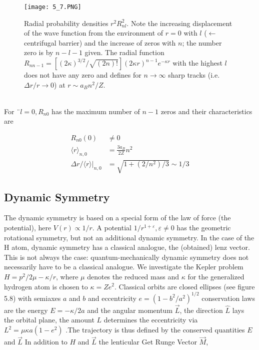 \begin{figure}[ht]
    \begin{minipage}{0.5\textwidth}
        \centering
        \texttt{[image: 5\_7.PNG]}
    \end{minipage}
    \begin{minipage}{0.5\textwidth}
        \caption{Radial probability densities $r^2R^2_{nl}$. Note the increasing displacement of the wave function        from the environment of $r = 0$
        with $l$ ($\leftarrow$ centrifugal barrier)
        and the increase of zeros with $n$; the number zero is by $n - l - 1$
        given. The radial function
        $R_{nn-1}=[(2\kappa)^{3/2}/\sqrt{(2n)!}](2\kappa r)^{n-1}e^{-\kappa r}$ with the
        highest $l$ does not have any zero and defines for $n \rightarrow \infty$ sharp tracks (i.e.  $\Delta r / r \rightarrow 0$) at $r\sim a_B n^2/Z$.}
    \end{minipage}
\end{figure}
\\
For $¨l = 0, R_{n0}$ has the maximum number of $n - 1$ zeros and their characteristics are

\begin{equation}
\begin{aligned} R_{n 0}(0) & \neq 0 \\\langle r\rangle_{n, 0} &=\frac{3 a_{B}}{2 Z} n^{2} \\ \Delta r /\left.\langle r\rangle\right|_{n, 0} &=\sqrt{1+\left(2 / n^{2}\right) / 3} \sim 1 / 3 \end{aligned}
\end{equation}
\subsection{Dynamic Symmetry}
The dynamic symmetry is based on a special form of the law of force (the potential), here $V (r) \propto 1 / r$. A potential $1 / r^{1 + \varepsilon}, \varepsilon \neq 0$ has the geometric rotational symmetry, but not an additional dynamic symmetry. In the case of the H atom, dynamic symmetry has a classical analogue, the (obtained) lenz vector. This is not always the case: quantum-mechanically dynamic symmetry does not necessarily have to be a classical analogue. We investigate the Kepler problem $H = p^2 / 2\mu - \kappa / r$, where $\mu$ denotes the reduced mass and $\kappa$ for the generalized hydrogen atom is chosen to $\kappa = Ze^2$. Classical orbits are closed ellipses (see figure 5.8) with semiaxes $a$ and $b$ and eccentricity $e = (1 - b^2/a^2)^{1/2}$ conservation laws are the energy $E = -\kappa / 2a$ and the angular momentum $\vec{L}$, the direction $\hat{L}$ lays the orbital plane, the amount $L$ determines the eccentricity via $L^2 = \mu\kappa a (1 - e^2)$ .The trajectory is thus defined by the conserved quantities $E$ and $\vec{L}$ In addition to $H$ and $\vec{L}$ the lenticular Get Runge Vector $\vec{M}$,


